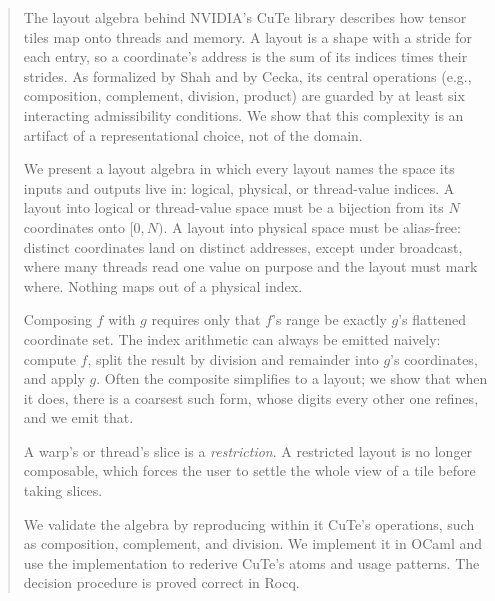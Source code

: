 \begin{abstract}
The layout algebra behind NVIDIA's CuTe library describes how tensor tiles map
onto threads and memory. A layout is a shape with a stride for each entry, so a
coordinate's address is the sum of its indices times their strides. As
formalized by Shah and by Cecka, its central operations (e.g., composition,
complement, division, product) are guarded by at least six interacting
admissibility conditions. We show that this complexity is an artifact of a
representational choice, not of the domain.

We present a layout algebra in which every layout names the space its inputs
and outputs live in: logical, physical, or thread-value indices. A layout into
logical or thread-value space must be a bijection from its $N$ coordinates onto
$[0,N)$. A layout into physical space must be alias-free: distinct coordinates
land on distinct addresses, except under broadcast, where many threads read one
value on purpose and the layout must mark where. Nothing maps out of a physical
index.

Composing $f$ with $g$ requires only that $f$'s range be exactly $g$'s
flattened coordinate set. The index arithmetic can always be emitted naively:
compute $f$, split the result by division and remainder into $g$'s coordinates,
and apply $g$. Often the composite simplifies to a layout; we show that when it
does, there is a coarsest such form, whose digits every other one refines, and
we emit that.

A warp's or thread's slice is a \emph{restriction}. A restricted layout is no
longer composable, which forces the user to settle the whole view of a tile
before taking slices.

We validate the algebra by reproducing within it CuTe's operations, such as
composition, complement, and division. We implement it in OCaml and use the
implementation to rederive CuTe's atoms and usage patterns. The decision
procedure is proved correct in Rocq.
\end{abstract}
